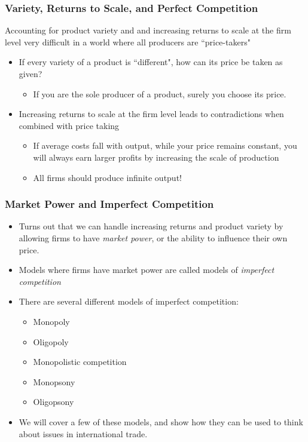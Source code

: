 \documentclass{beamer}
\begin{document}
\begin{frame}
	\frametitle{Variety, Returns to Scale, and Perfect Competition}
Accounting for product variety and and increasing returns to scale at the firm level very difficult in a world where all producers are ``price-takers"
	\begin{itemize}
		\item If every variety of a product is ``different", how can its price be taken as given?
			\begin{itemize}
				\item If you are the sole producer of a product, surely you choose its price.
			\end{itemize}
		\item Increasing returns to scale at the firm level leads to contradictions when combined with price taking
			\begin{itemize}
				\item If average costs fall with output, while your price remains constant, you will always earn larger profits by increasing the scale of production
						\item All firms should produce infinite output!
			\end{itemize}
	\end{itemize}
\end{frame}

\begin{frame}
	\frametitle{Market Power and Imperfect Competition}
\begin{itemize}
	 \item Turns out that we can handle increasing returns and product variety by allowing firms to have \emph{market power}, or the ability to influence their own price.
	 \item Models where firms have market power are called models of \emph{imperfect competition}
		\item There are several different models of imperfect competition:
		 	\begin{itemize}
		 		\item Monopoly\\
		 		\item Oligopoly\\
		 		\item Monopolistic competition\\
		 		\item Monopsony\\
		 		\item Oligopsony\\
		 	\end{itemize}
		 \item We will cover a few of these models, and show how they can be used to think about issues in international trade.
\end{itemize}
\end{frame}
\end{document}

